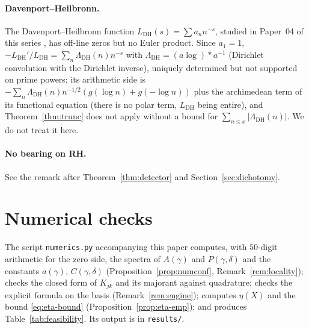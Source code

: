 \documentclass[11pt]{amsart}
\theoremstyle{definition}
\theoremstyle{remark}
\begin{document}
\paragraph{Davenport--Heilbronn.}
The Davenport--Heilbronn function $L_{\mathrm{DH}}(s)=\sum a_nn^{-s}$, studied
in Paper~04 of this series \cite{P04}, has off-line zeros but no Euler
product. Since $a_1=1$, $-L_{\mathrm{DH}}'/L_{\mathrm{DH}}=\sum_n\Lambda_{\mathrm{DH}}(n)n^{-s}$
with $\Lambda_{\mathrm{DH}}=(a\log)*a^{-1}$ (Dirichlet convolution with the
Dirichlet inverse), uniquely determined but not supported on prime powers;
its arithmetic side is
$-\sum_n\Lambda_{\mathrm{DH}}(n)n^{-1/2}(g(\log n)+g(-\log n))$ plus the
archimedean term of its functional equation (there is no polar term,
$L_{\mathrm{DH}}$ being entire), and Theorem~\ref{thm:trunc} does not apply
without a bound for $\sum_{n\le x}|\Lambda_{\mathrm{DH}}(n)|$. We do not treat
it here.

\paragraph{No bearing on RH.}
See the remark after Theorem~\ref{thm:detector} and
Section~\ref{sec:dichotomy}.

\section{Numerical checks}\label{sec:repro}

The script \texttt{numerics.py} accompanying this paper computes, with
$50$-digit arithmetic for the zero side, the spectra of $A(\gamma)$ and
$P(\gamma,\delta)$ and the constants $a(\gamma)$, $C(\gamma,\delta)$
(Proposition~\ref{prop:numconf}, Remark~\ref{rem:locality}); checks the closed
form of $K_{jk}$ and its majorant against quadrature; checks the explicit
formula on the basis (Remark~\ref{rem:engine}); computes $\eta(X)$ and the
bound \eqref{eq:eta-bound} (Proposition~\ref{prop:eta-emp}); and produces
Table~\ref{tab:feasibility}. Its output is in \texttt{results/}.
\end{document}
